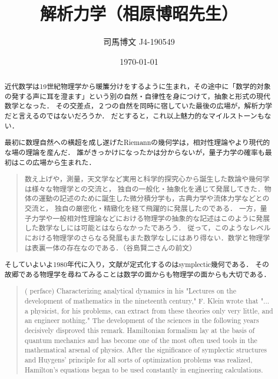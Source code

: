 \documentclass[uplatex, 12pt, dvipdfmx]{jsreport}
\title{解析力学（相原博昭先生）}
\author{司馬博文 J4-190549}
\date{\today}
\begin{document}
\tableofcontents

\begin{abstract}
    近代数学は19世紀物理学から暖簾分けをするように生まれ，その途中に「数学的対象の発する声に耳を澄ます」という別の自然・自律性を身につけて，抽象と形式の現代数学となった．
    その交差点，２つの自然を同時に宿していた最後の広場が，解析力学だと言えるのではないだろうか．
    だとすると，これ以上魅力的なマイルストーンもない．

    最初に数理自然への横超を成し遂げたRiemannの幾何学は，相対性理論やより現代的な場の理論を産んだ．
    誰がきっかけになったかは分からないが，量子力学の確率も最初はこの広場から生まれた．
    \begin{quotation}
        数え上げや，測量，天文学など実用と科学的探究心から誕生した数論や幾何学は様々な物理学との交流と，
        独自の一般化・抽象化を通じて発展してきた．物体の運動の記述のために誕生した微分積分学も，古典力学や流体力学などとの交流と，
        独自の厳密化・精緻化を経て飛躍的に発展したのである．
        一方，量子力学や一般相対性理論などにおける物理学の抽象的な記述はこのように発展した数学なしには可能とはならなかったであろう．
        従って，このようなレベルにおける物理学のさらなる発展もまた数学なしにはあり得ない．数学と物理学は表裏一体の存在なのである．\cite{磯崎}（谷島賢二さんの前文）
    \end{quotation}
    そしていよいよ1980年代に入り，文献\cite{Arnold}が定式化するのはsymplectic幾何である．
    その故郷である物理学を尋ねてみることは数学の面からも物理学の面からも大切である．
    \begin{quotation}
        (\cite{Arnold} perface) Characterizing analytical dynamics in his "Lectures on the development of mathematics in the nineteenth century," F. Klein wrote that "... a physicist, for his problems, can extract from these theories only very little, and an engineer nothing." The development of the sciences in the following years decisively disproved this remark.
        Hamiltonian formalism lay at the basis of quantum mechanics and has become one of the most often used tools in the mathematical arsenal of physics.
        After the significance of symplectic structures and Huygens' principle for all sorts of optimization problems was realized, Hamilton's equations began to be used constantly in engineering calculations.


\end{quotation}
\end{abstract}
\end{document}
